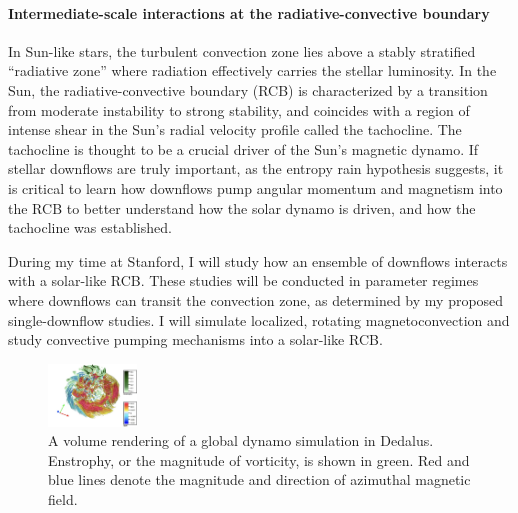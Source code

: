 \documentclass[aps, pre, onecolumn, nofootinbib, notitlepage, groupedaddress, amsfonts, amssymb, amsmath]{revtex4-1}
\begin{document}
\paragraph*{Intermediate-scale interactions at the radiative-convective boundary}
In Sun-like stars, the turbulent convection zone lies above a stably stratified ``radiative zone'' where radiation effectively carries the stellar luminosity.
In the Sun, the radiative-convective boundary (RCB) is characterized by a transition from moderate instability to strong stability, and coincides with a region of intense shear in the Sun's radial velocity profile called the tachocline.
The tachocline is thought to be a crucial driver of the Sun's magnetic dynamo.
If stellar downflows are truly important, as the entropy rain hypothesis suggests, it is critical to learn how downflows pump angular momentum and magnetism into the RCB to better understand how the solar dynamo is driven, and how the tachocline was established.

During my time at Stanford, I will study how an ensemble of downflows interacts with a solar-like RCB.
These studies will be conducted in parameter regimes where downflows can transit the convection zone, as determined by my proposed single-downflow studies.
I will simulate localized, rotating magnetoconvection and study convective pumping mechanisms into a solar-like RCB.

\begin{figure}
	\begin{center}
	\vspace{-22pt}
    \includegraphics[width=0.21\textwidth]{./figs/mdwarf.png}
	\vspace{-16pt}
	\end{center}
    \caption{A volume rendering of a global dynamo simulation in Dedalus.
	Enstrophy, or the magnitude of vorticity, is shown in green.
	Red and blue lines denote the magnitude and direction of azimuthal magnetic field.
	\label{fig:mdwarf} }
	\vspace{-11pt}
\end{figure}
\end{document}
